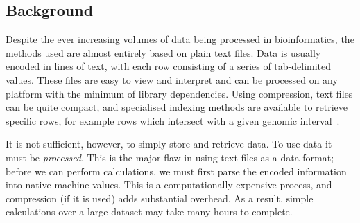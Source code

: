 \documentclass[10pt]{bmc_article}
\newenvironment{bmcformat}{\begin{raggedright}\baselineskip20pt\sloppy\setboolean{publ}{false}}{\end{raggedright}\baselineskip20pt\sloppy}
\begin{document}
\begin{bmcformat}


\section*{Background} 

%
Despite the ever increasing volumes of data being processed in bioinformatics,
the methods used are almost entirely based on plain text files. Data is 
usually encoded in lines of text, with each row consisting of a series of tab-delimited 
values.
These files are easy to view and interpret and can be processed on 
any platform with the minimum of library dependencies. Using compression,
text files can be quite compact, and specialised indexing methods 
are available to retrieve specific rows, for example rows which intersect with a 
given genomic interval~\cite{li11}.

It is not sufficient, however, to simply store and retrieve data. To use data
it must be \emph{processed}. This is the major flaw in 
using text files as a data format; before we can perform calculations, we 
must first parse the encoded information into native 
machine values. This is a computationally expensive process, and 
compression (if it is used) adds substantial overhead. 
As a result,  simple calculations over a large dataset may take 
many hours to complete.


\end{bmcformat}
\end{document}
